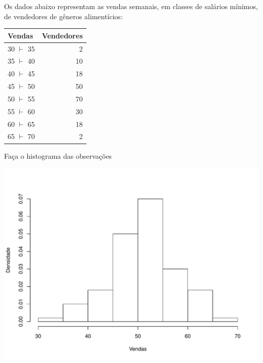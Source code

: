 \documentclass[a4paper,11pt,fleqn]{article}\usepackage[]{graphicx}\usepackage[]{color}
\newenvironment{knitrout}{}{} %
\theoremstyle{definition}
\begin{document}
\begin{compactenum}[7.] %
\item Os dados abaixo representam as vendas semanais, em classes de
  salários mínimos, de vendedores de gêneros alimentícios:
\begin{table}[ht]
\centering
\begin{tabular}{lr}
  \hline
Vendas & Vendedores \\ 
  \hline
30 $\vdash$ 35 & 2 \\ 
  35 $\vdash$ 40 & 10 \\ 
  40 $\vdash$ 45 & 18 \\ 
  45 $\vdash$ 50 & 50 \\ 
  50 $\vdash$ 55 & 70 \\ 
  55 $\vdash$ 60 & 30 \\ 
  60 $\vdash$ 65 & 18 \\ 
  65 $\vdash$ 70 & 2 \\ 
   \hline
\end{tabular}
\end{table}

\begin{compactenum}
\item Faça o histograma das observações
\begin{knitrout}\small
{}\color{fgcolor}

{\centering \includegraphics[width=.6\textwidth]{figure/unnamed-chunk-11-1} 

}




\end{knitrout}
\end{compactenum}
\end{compactenum}
\end{document}
